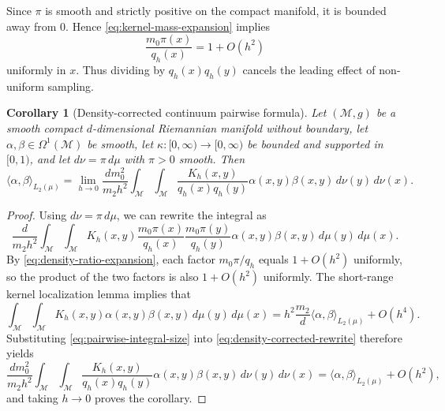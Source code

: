 \documentclass[a4paper,11pt, DIV=10]{scrartcl}
\numberwithin{equation}{section}
\newtheorem{corollary}[theorem]{Corollary}
\theoremstyle{definition}
\theoremstyle{remark}
\newcommand{\mc}[1]{\mathcal{#1}}
\begin{document}
Since $\pi$ is smooth and strictly positive on the compact manifold, it is bounded away from $0$. Hence \eqref{eq:kernel-mass-expansion} implies
\begin{equation}
\label{eq:density-ratio-expansion}
\frac{m_0\pi(x)}{q_h(x)}=1+O(h^2)
\end{equation}
uniformly in $x$.
Thus dividing by $q_h(x)q_h(y)$ cancels the leading effect of non-uniform sampling.

\begin{corollary}[Density-corrected continuum pairwise formula]
Let $(\mc{M},g)$ be a smooth compact $d$-dimensional Riemannian manifold without boundary, let $\alpha,\beta\in \Omega^1(\mc{M})$ be smooth, let $\kappa\colon [0,\infty)\to [0,\infty)$ be bounded and supported in $[0,1)$, and let $d\nu=\pi\,d\mu$ with $\pi>0$ smooth. Then
\begin{equation}
\label{eq:density-corrected-pairwise-formula}
\langle \alpha,\beta\rangle_{L_2(\mu)}
=
\lim_{h\to 0}
\frac{dm_0^2}{m_2h^2}
\int_{\mc{M}}\int_{\mc{M}}
\frac{K_h(x,y)}{q_h(x)q_h(y)}
\alpha(x,y)\beta(x,y)\,d\nu(y)\,d\nu(x).
\end{equation}
\end{corollary}
\begin{proof}
Using $d\nu=\pi\,d\mu$, we can rewrite the integral as
\begin{equation}
\label{eq:density-corrected-rewrite}
\frac{d}{m_2h^2}
\int_{\mc{M}}\int_{\mc{M}}
K_h(x,y)
\frac{m_0\pi(x)}{q_h(x)}
\frac{m_0\pi(y)}{q_h(y)}
\alpha(x,y)\beta(x,y)\,d\mu(y)\,d\mu(x).
\end{equation}
By \eqref{eq:density-ratio-expansion}, each factor $m_0\pi/q_h$ equals $1+O(h^2)$ uniformly, so the product of the two factors is also $1+O(h^2)$ uniformly. The short-range kernel localization lemma implies that
\begin{equation}
\label{eq:pairwise-integral-size}
\int_{\mc{M}}\int_{\mc{M}} K_h(x,y)\alpha(x,y)\beta(x,y)\,d\mu(y)\,d\mu(x)
=
h^2\frac{m_2}{d}\langle \alpha,\beta\rangle_{L_2(\mu)}+O(h^4).
\end{equation}
Substituting \eqref{eq:pairwise-integral-size} into \eqref{eq:density-corrected-rewrite} therefore yields
\begin{equation}
\frac{dm_0^2}{m_2h^2}
\int_{\mc{M}}\int_{\mc{M}}
\frac{K_h(x,y)}{q_h(x)q_h(y)}
\alpha(x,y)\beta(x,y)\,d\nu(y)\,d\nu(x)
=
\langle \alpha,\beta\rangle_{L_2(\mu)}+O(h^2),
\end{equation}
and taking $h\to 0$ proves the corollary.
\end{proof}
\end{document}
